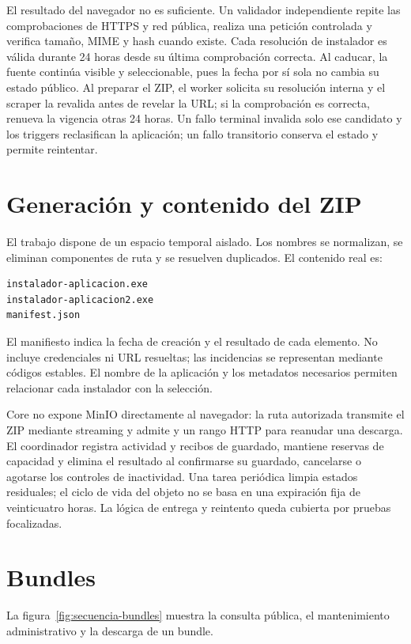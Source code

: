 El resultado del navegador no es suficiente. Un validador independiente repite las comprobaciones de HTTPS y red pública, realiza una petición controlada y verifica tamaño, MIME y hash cuando existe. Cada resolución de instalador es válida durante 24 horas desde su última comprobación correcta. Al caducar, la fuente continúa visible y seleccionable, pues la fecha por sí sola no cambia su estado público. Al preparar el ZIP, el worker solicita su resolución interna y el scraper la revalida antes de revelar la URL; si la comprobación es correcta, renueva la vigencia otras 24 horas. Un fallo terminal invalida solo ese candidato y los triggers reclasifican la aplicación; un fallo transitorio conserva el estado y permite reintentar.

\section{Generación y contenido del ZIP}

El trabajo dispone de un espacio temporal aislado. Los nombres se normalizan, se eliminan componentes de ruta y se resuelven duplicados. El contenido real es:

\begin{verbatim}
instalador-aplicacion.exe
instalador-aplicacion2.exe
manifest.json
\end{verbatim}

El manifiesto indica la fecha de creación y el resultado de cada elemento. No incluye credenciales ni URL resueltas; las incidencias se representan mediante códigos estables. El nombre de la aplicación y los metadatos necesarios permiten relacionar cada instalador con la selección.

Core no expone MinIO directamente al navegador: la ruta autorizada transmite el ZIP mediante streaming y admite  y un rango HTTP para reanudar una descarga. El coordinador registra actividad y recibos de guardado, mantiene reservas de capacidad y elimina el resultado al confirmarse su guardado, cancelarse o agotarse los controles de inactividad. Una tarea periódica limpia estados residuales; el ciclo de vida del objeto no se basa en una expiración fija de veinticuatro horas. La lógica de entrega y reintento queda cubierta por pruebas focalizadas.

\section{Bundles}

La figura~\ref{fig:secuencia-bundles} muestra la consulta pública, el mantenimiento administrativo y la descarga de un bundle.

